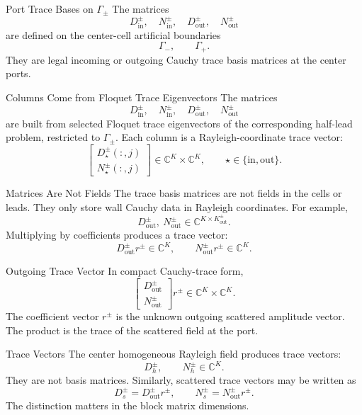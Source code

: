\documentclass[aspectratio=169]{beamer}
\begin{document}
\begin{frame}{Port Trace Bases on \(\Gamma_\pm\)}
  The matrices
  \[
    D_{\mathrm{in}}^\pm,\quad
    N_{\mathrm{in}}^\pm,\quad
    D_{\mathrm{out}}^\pm,\quad
    N_{\mathrm{out}}^\pm
  \]
  are defined on the center-cell artificial boundaries
  \[
    \Gamma_-,
    \qquad
    \Gamma_+.
  \]
  They are legal incoming or outgoing Cauchy trace basis matrices at the center ports.
\end{frame}

\begin{frame}{Columns Come from Floquet Trace Eigenvectors}
  The matrices
  \[
    D_{\mathrm{in}}^\pm,\quad
    N_{\mathrm{in}}^\pm,\quad
    D_{\mathrm{out}}^\pm,\quad
    N_{\mathrm{out}}^\pm
  \]
  are built from selected Floquet trace eigenvectors of the corresponding half-lead problem, restricted to \(\Gamma_\pm\).
  Each column is a Rayleigh-coordinate trace vector:
  \[
    \begin{bmatrix}
      D_{\star}^\pm(:,j)\\
      N_{\star}^\pm(:,j)
    \end{bmatrix}
    \in
    \mathbb C^K\times\mathbb C^K,
    \qquad
    \star\in\{\mathrm{in},\mathrm{out}\}.
  \]
\end{frame}

\begin{frame}{Matrices Are Not Fields}
  The trace basis matrices are not fields in the cells or leads.
  They only store wall Cauchy data in Rayleigh coordinates.
  For example,
  \[
    D_{\mathrm{out}}^\pm,\ N_{\mathrm{out}}^\pm
    \in
    \mathbb C^{K\times K_{\mathrm{out}}^\pm}.
  \]
  Multiplying by coefficients produces a trace vector:
  \[
    D_{\mathrm{out}}^\pm r^\pm\in\mathbb C^K,
    \qquad
    N_{\mathrm{out}}^\pm r^\pm\in\mathbb C^K.
  \]
\end{frame}

\begin{frame}{Outgoing Trace Vector}
  In compact Cauchy-trace form,
  \[
    \begin{bmatrix}
      D_{\mathrm{out}}^\pm\\
      N_{\mathrm{out}}^\pm
    \end{bmatrix}
    r^\pm
    \in
    \mathbb C^K\times\mathbb C^K.
  \]
  The coefficient vector \(r^\pm\) is the unknown outgoing scattered amplitude vector.
  The product is the trace of the scattered field at the port.
\end{frame}

\begin{frame}{Trace Vectors}
  The center homogeneous Rayleigh field produces trace vectors:
  \[
    D_h^\pm,\qquad N_h^\pm \in\mathbb C^K.
  \]
  They are not basis matrices.
  Similarly, scattered trace vectors may be written as
  \[
    D_s^\pm=D_{\mathrm{out}}^\pm r^\pm,
    \qquad
    N_s^\pm=N_{\mathrm{out}}^\pm r^\pm.
  \]
  The distinction matters in the block matrix dimensions.
\end{frame}
\end{document}
